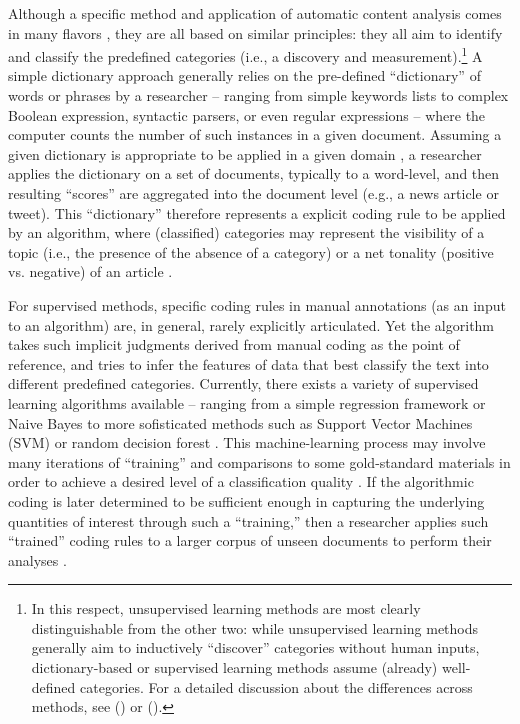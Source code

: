 \documentclass[man, 12pt, a4paper, nolmodern, noextraspace]{apa6}
\begin{document}
    Although a specific method and application of automatic content analysis comes in many flavors \parencites[for a broad overview, see:][]{Boumans_Trilling_2016, grimmer2013text}, they are all based on similar principles: they all aim to identify and classify the predefined categories (i.e., a discovery and measurement).\footnote{In this respect, unsupervised learning methods are most clearly distinguishable from the other two: while unsupervised learning methods generally aim to inductively \enquote{discover} categories without human inputs, dictionary-based or supervised learning methods assume (already) well-defined categories. For a detailed discussion about the differences across methods, see \citeauthor{grimmer2013text} (\citeyear{grimmer2013text}) or \citeauthor{Boumans_Trilling_2016} (\citeyear{Boumans_Trilling_2016}).} A simple dictionary approach generally relies on the pre-defined “dictionary” of words or phrases by a researcher -- ranging from simple keywords lists to complex Boolean expression, syntactic parsers, or even regular expressions -- where the computer counts the number of such instances in a given document. Assuming a given dictionary is appropriate to be applied in a given domain \parencite{Boumans_Trilling_2016, gonzalez2015signals}, a researcher applies the dictionary on a set of documents, typically to a word-level, and then resulting \enquote{scores} are aggregated into the document level (e.g., a news article or tweet). This \enquote{dictionary} therefore represents a explicit coding rule to be applied by an algorithm, where (classified) categories may represent the visibility of a topic (i.e., the presence of the absence of a category) or a net tonality (positive vs. negative) of an article \parencites[e.g.,][]{Aaldering2016, YoungSoroka2012, boomgaaden2009, gonzalez2015signals, Rooduijn2011}. 
    
    For supervised methods, specific coding rules in manual annotations (as an input to an algorithm) are, in general, rarely explicitly articulated. Yet the algorithm takes such implicit judgments derived from manual coding as the point of reference, and tries to infer the features of data that best classify the text into different predefined categories. Currently, there exists a variety of supervised learning algorithms available -- ranging from a simple regression framework or Naive Bayes to more sofisticated methods such as Support Vector Machines (SVM) or random decision forest \parencites[for an overview of different algorithms commonly used in social science applications, see][]{hindman2015building}. This machine-learning process may involve many iterations of \enquote{training} and comparisons to some gold-standard materials in order to achieve a desired level of a classification quality \parencites[e.g.,][]{scharkow2013thematic}. If the algorithmic coding is later determined to be sufficient enough in capturing the underlying quantities of interest through such a \enquote{training,} then a researcher applies such \enquote{trained} coding rules to a larger corpus of unseen documents to perform their analyses \parencites[e.g.,][]{burscher2015using, burscher2014teaching, scharkow2013thematic, gonzalez2015signals}.    
    
\end{document}
